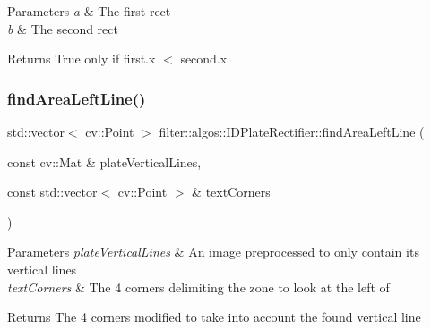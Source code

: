 \begin{DoxyParams}{Parameters}
{\em a} & The first rect \\
\hline
{\em b} & The second rect \\
\hline
\end{DoxyParams}
\begin{DoxyReturn}{Returns}
True only if first.\+x $<$ second.\+x 
\end{DoxyReturn}
\mbox{\label{classfilter_1_1algos_1_1_i_d_plate_rectifier_a6db5f773619b53ace466d0d29d17f7d7}} 
\subsubsection{\texorpdfstring{find\+Area\+Left\+Line()}{findAreaLeftLine()}}
{\footnotesize\ttfamily std\+::vector$<$ cv\+::\+Point $>$ filter\+::algos\+::\+I\+D\+Plate\+Rectifier\+::find\+Area\+Left\+Line (\begin{DoxyParamCaption}\item[{const cv\+::\+Mat \&}]{plate\+Vertical\+Lines,  }\item[{const std\+::vector$<$ cv\+::\+Point $>$ \&}]{text\+Corners }\end{DoxyParamCaption})\hspace{0.3cm}{\ttfamily [private]}}


\begin{DoxyParams}{Parameters}
{\em plate\+Vertical\+Lines} & An image preprocessed to only contain its vertical lines \\
\hline
{\em text\+Corners} & The 4 corners delimiting the zone to look at the left of \\
\hline
\end{DoxyParams}
\begin{DoxyReturn}{Returns}
The 4 corners modified to take into account the found vertical line 
\end{DoxyReturn}
\mbox{\label{classfilter_1_1algos_1_1_i_d_plate_rectifier_a1f6a2ed33e717d5cd2266e22170add7f}} 

